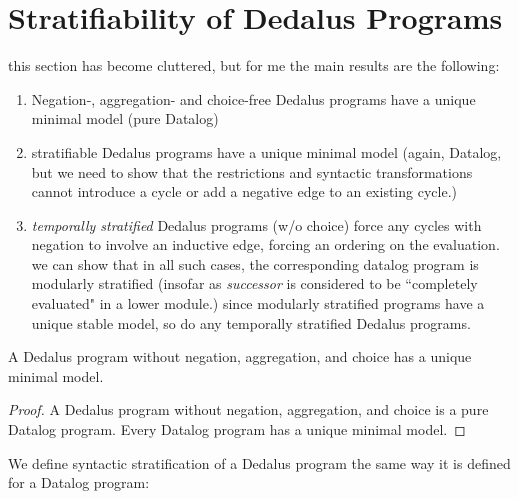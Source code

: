 
\section{Stratifiability of Dedalus Programs}


this section has become cluttered, but for me the main results are the following:

\begin{enumerate}
\item Negation-, aggregation- and choice-free Dedalus programs have a unique minimal model (pure Datalog)
\item stratifiable Dedalus programs have a unique minimal model (again, Datalog, but we need to show that the restrictions and syntactic transformations
cannot introduce a cycle or add a negative edge to an existing cycle.)
\item \emph{temporally stratified} Dedalus programs (w/o choice) force any cycles with negation to involve an inductive edge, forcing an ordering on the evaluation.
we can show that in all such cases, the corresponding datalog program is modularly stratified (insofar as \emph{successor} is considered to be ``completely
evaluated" in a lower module.)  since modularly stratified programs have a unique stable model, so do any temporally stratified Dedalus programs.
\end{enumerate}

\begin{lemma} 
%
A Dedalus program without negation, aggregation, and choice has a unique
minimal model.
%
\end{lemma}

\begin{proof} 
%
A Dedalus program without negation, aggregation, and choice is a pure Datalog
program.  Every Datalog program has a unique minimal model. 
%
\end{proof}



We define syntactic stratification of a Dedalus program the same way it is
defined for a Datalog program:

